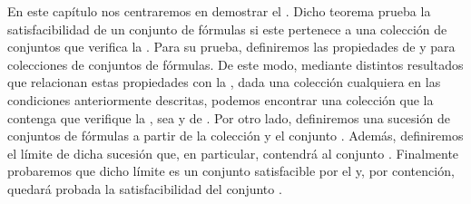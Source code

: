 %
\begin{isabellebody}%
%
%
\isadelimtheory
%
\endisadelimtheory
%
\isatagtheory
%
\endisatagtheory
{\isafoldtheory}%
%
\isadelimtheory
%
\endisadelimtheory
%
\begin{isamarkuptext}%
En este capítulo nos centraremos en demostrar el .
  Dicho teorema prueba la satisfacibilidad de un conjunto de fórmulas  si este pertenece a una 
  colección de conjuntos  que verifica la . Para su 
  prueba, definiremos las propiedades de  y  para
  colecciones de conjuntos de fórmulas. De este modo, mediante distintos resultados que relacionan
  estas propiedades con la , dada una colección  
  cualquiera en las condiciones anteriormente descritas, podemos encontrar una colección  que la 
  contenga que verifique la , sea  y de . Por otro lado, definiremos una sucesión de conjuntos de
  fórmulas a partir de la colección  y el conjunto . Además, definiremos el límite de dicha
  sucesión que, en particular, contendrá al conjunto . Finalmente probaremos que dicho límite es 
  un conjunto satisfacible por el  y, por contención, quedará probada la 
  satisfacibilidad del conjunto .


\end{isamarkuptext}
\end{isabellebody}
